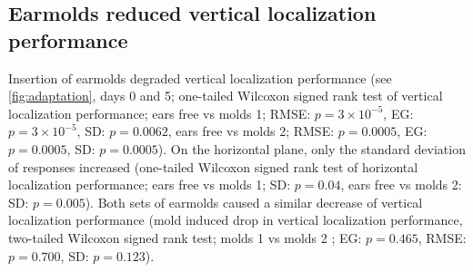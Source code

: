 \subsection{Earmolds reduced vertical localization performance}

Insertion of earmolds degraded vertical localization performance (see \cref{fig:adaptation}, days 0 and 5; one-tailed Wilcoxon signed rank test of vertical localization performance; ears free vs molds 1; RMSE: $p = 3  \times 10^{-5}$, EG: $p = 3 \times 10^{-5}$, SD: $p = 0.0062$, ears free vs molds 2; RMSE: $p = 0.0005$, EG: $p = 0.0005$, SD: $p = 0.0005$). On the horizontal plane, only the standard deviation of responses increased (one-tailed Wilcoxon signed rank test of horizontal localization performance; ears free vs molds 1; SD: $p = 0.04$, ears free vs molds 2: SD: $p = 0.005$). Both sets of earmolds caused a similar decrease of vertical localization performance (mold induced drop in vertical localization performance, two-tailed Wilcoxon signed rank test; molds 1 vs molds 2 ; EG: $p = 0.465$, RMSE: $p = 0.700$, SD: $p = 0.123$).

